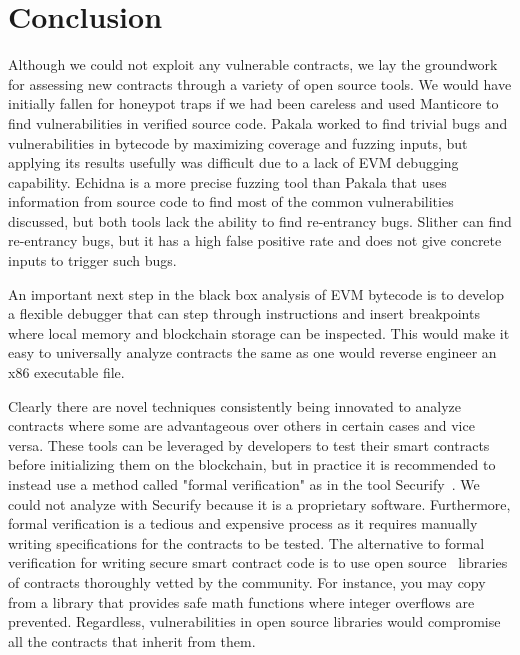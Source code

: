 \section{Conclusion}
Although we could not exploit any vulnerable contracts, we lay the groundwork for assessing new contracts through a variety of open source tools.
We would have initially fallen for honeypot traps if we had been careless and used Manticore to find vulnerabilities in verified source code.
Pakala worked to find trivial bugs and vulnerabilities in bytecode by maximizing coverage and fuzzing inputs, but applying its results usefully was difficult due to a lack of EVM debugging capability.
Echidna is a more precise fuzzing tool than Pakala that uses information from source code to find most of the common vulnerabilities discussed, but both tools lack the ability to find re-entrancy bugs.
Slither can find re-entrancy bugs, but it has a high false positive rate and does not give concrete inputs to trigger such bugs.

An important next step in the black box analysis of EVM bytecode is to develop a flexible debugger that can step through instructions and insert breakpoints where local memory and blockchain storage can be inspected.
This would make it easy to universally analyze contracts the same as one would reverse engineer an x86 executable file.

Clearly there are novel techniques consistently being innovated to analyze contracts where some are advantageous over others in certain cases and vice versa.
These tools can be leveraged by developers to test their smart contracts before initializing them on the blockchain, but in practice it is recommended to instead use a method called "formal verification" as in the tool Securify~\cite{securify}.
We could not analyze with Securify because it is a proprietary software.
Furthermore, formal verification is a tedious and expensive process as it requires manually writing specifications for the contracts to be tested.
The alternative to formal verification for writing secure smart contract code is to use open source~\cite{openzeppelin} libraries of contracts thoroughly vetted by the community.
For instance, you may copy from a library that provides safe math functions where integer overflows are prevented.
Regardless, vulnerabilities in open source libraries would compromise all the contracts that inherit from them.










